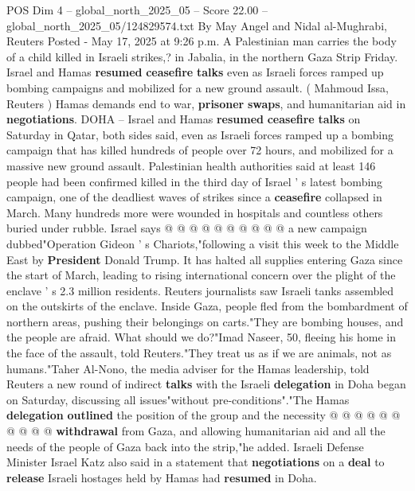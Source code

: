\begin{textsample}{POS Dim 4 – global\_north\_2025\_05 – Score 22.00 – global\_north\_2025\_05/124829574.txt}  \label{ex:f4_pos_220}
By May Angel and Nidal al-Mughrabi, Reuters Posted - May 17, 2025 at 9:26 p.m.
A Palestinian man carries the body of a child killed in Israeli strikes,? in Jabalia, in the northern Gaza Strip Friday.
Israel and Hamas \textbf{resumed} \textbf{ceasefire} \textbf{talks} even as Israeli forces ramped up bombing campaigns and mobilized for a new ground assault. ( Mahmoud Issa, Reuters ) Hamas demands end to war, \textbf{prisoner} \textbf{swaps}, and humanitarian aid in \textbf{negotiations}.
DOHA -- Israel and Hamas \textbf{resumed} \textbf{ceasefire} \textbf{talks} on Saturday in Qatar, both sides said, even as Israeli forces ramped up a bombing campaign that has killed hundreds of people over 72 hours, and mobilized for a massive new ground assault.
Palestinian health authorities said at least 146 people had been confirmed killed in the third day of Israel ' s latest bombing campaign, one of the deadliest waves of strikes since a \textbf{ceasefire} collapsed in March.
Many hundreds more were wounded in hospitals and countless others buried under rubble.
Israel says @ @ @ @ @ @ @ @ @ @ a new campaign dubbed"Operation Gideon ' s Chariots,"following a visit this week to the Middle East by \textbf{President} Donald Trump.
It has halted all supplies entering Gaza since the start of March, leading to rising international concern over the plight of the enclave ' s 2.3 million residents.
Reuters journalists saw Israeli tanks assembled on the outskirts of the enclave.
Inside Gaza, people fled from the bombardment of northern areas, pushing their belongings on carts."They are bombing houses, and the people are afraid.
What should we do?"Imad Naseer, 50, fleeing his home in the face of the assault, told Reuters."They treat us as if we are animals, not as humans."Taher Al-Nono, the media adviser for the Hamas leadership, told Reuters a new round of indirect \textbf{talks} with the Israeli \textbf{delegation} in Doha began on Saturday, discussing all issues"without pre-conditions"."The Hamas \textbf{delegation} \textbf{outlined} the position of the group and the necessity @ @ @ @ @ @ @ @ @ @ \textbf{withdrawal} from Gaza, and allowing humanitarian aid and all the needs of the people of Gaza back into the strip,"he added.
Israeli Defense Minister Israel Katz also said in a statement that \textbf{negotiations} on a \textbf{deal} to \textbf{release} Israeli hostages held by Hamas had \textbf{resumed} in Doha.

\end{textsample}
